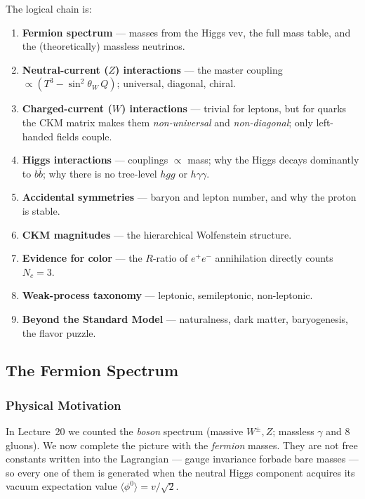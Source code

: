 The logical chain is:
\begin{enumerate}
  \item \textbf{Fermion spectrum} --- masses from the Higgs vev, the full
        mass table, and the (theoretically) massless neutrinos.
  \item \textbf{Neutral-current ($Z$) interactions} --- the master
        coupling $\propto (T^3-\sin^2\theta_W\,Q)$; universal, diagonal,
        chiral.
  \item \textbf{Charged-current ($W$) interactions} --- trivial for
        leptons, but for quarks the CKM matrix makes them
        \emph{non-universal} and \emph{non-diagonal}; only left-handed
        fields couple.
  \item \textbf{Higgs interactions} --- couplings $\propto$ mass; why the
        Higgs decays dominantly to $b\bar b$; why there is no tree-level
        $hgg$ or $h\gamma\gamma$.
  \item \textbf{Accidental symmetries} --- baryon and lepton number,
        and why the proton is stable.
  \item \textbf{CKM magnitudes} --- the hierarchical Wolfenstein
        structure.
  \item \textbf{Evidence for color} --- the $R$-ratio of
        $e^+e^-$ annihilation directly counts $N_c=3$.
  \item \textbf{Weak-process taxonomy} --- leptonic, semileptonic,
        non-leptonic.
  \item \textbf{Beyond the Standard Model} --- naturalness, dark matter,
        baryogenesis, the flavor puzzle.
\end{enumerate}

\subsection{The Fermion Spectrum}\label{subsec:lec21:spectrum}

\subsubsection*{Physical Motivation}

In Lecture~20 we counted the \emph{boson} spectrum (massive $W^\pm,Z$;
massless $\gamma$ and $8$ gluons). We now complete the picture with the
\emph{fermion} masses. They are not free constants written into the
Lagrangian --- gauge invariance forbade bare masses --- so every one of
them is generated when the neutral Higgs component acquires its vacuum
expectation value $\langle\phi^0\rangle = v/\sqrt2$.

